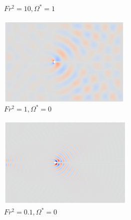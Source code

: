\begin{figure}
\begin{subfigure}[b]{0.32\textwidth}
        \caption{$Fr^2 = 10, \Omega^{\ast} = 1$}
        \label{fig:av1frs10}
    \end{subfigure}

    \begin{subfigure}[b]{0.32\textwidth}
        \centering
        \includegraphics[width=\textwidth]{images/circle/av0fr1.png}
        \caption{$Fr^2 = 1, \Omega^{\ast} = 0$}
        \label{fig:av0frs1}
    \end{subfigure}
    \hfill
    \begin{subfigure}[b]{0.32\textwidth}
        \centering
        \includegraphics[width=\textwidth]{images/circle/av0fr0p3.png}
        \caption{$Fr^2 = 0.1, \Omega^{\ast} = 0$}
        \label{fig:av0frs0p1}
    \end{subfigure}
    \hfill
    \begin{subfigure}[b]{0.32\textwidth}
        \centering

\end{subfigure}
\end{figure}
